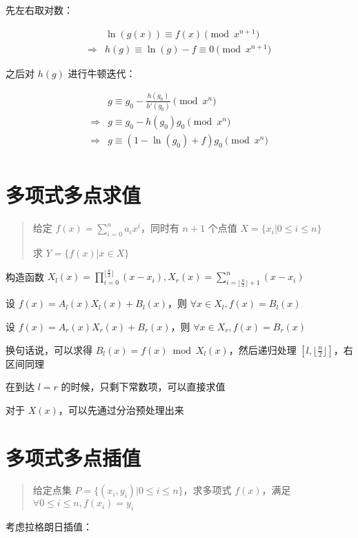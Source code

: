 \documentclass[UTF8]{article}
\begin{document}
先左右取对数：

$$
\begin{aligned}
& \ln(g(x)) \equiv f(x) \pmod {x^{n+1}} \\
\Rightarrow
&h(g) \equiv \ln(g)-f \equiv 0\pmod  {x^{n+1}}
\end{aligned}
$$

之后对 $h(g)$ 进行牛顿迭代：

$$
\begin{aligned}
& g \equiv g_0-\frac{h(g_0)}{h'(g_0)} \pmod {x^{n}} \\
\Rightarrow 
& g \equiv g_0-h(g_0)g_0 \pmod {x^{n}} \\
\Rightarrow 
& g \equiv (1-\ln(g_0)+f)g_0\pmod {x^{n}} \\
\end{aligned}
$$

\section{多项式多点求值}

\begin{quotation}
    给定 $f(x)=\sum_{i=0}^{n}a_ix^i$，同时有 $n+1$ 个点值 $X=\{x_i | 0 \le i \le n\}$
    
    求 $Y=\{f(x) | x \in X\}$
\end{quotation}

构造函数 $X_l(x)=\prod_{i=0}^{\lfloor \frac{n}{2} \rfloor}(x-x_i),X_r(x)=\sum_{i=\lfloor \frac{n}{2} \rfloor+1}^{n}(x-x_i)$

设 $f(x)=A_l(x)X_l(x)+B_l(x)$，则 $\forall x \in X_l,f(x)=B_l(x)$

设 $f(x)=A_r(x)X_r(x)+B_r(x)$，则 $\forall x \in X_r,f(x)=B_r(x)$

换句话说，可以求得 $B_l(x)=f(x) \bmod X_l(x)$，然后递归处理 $[l,\lfloor \frac{n}{2} \rfloor]$，右区间同理

在到达 $l=r$ 的时候，只剩下常数项，可以直接求值

对于 $X(x)$，可以先通过分治预处理出来

\section{多项式多点插值}

\begin{quotation}
    给定点集 $P=\{(x_i,y_i) | 0 \le i \le n\}$，求多项式 $f(x)$，满足 $\forall 0 \le i \le n, f(x_i)=y_i$
\end{quotation}

考虑拉格朗日插值：
\end{document}

